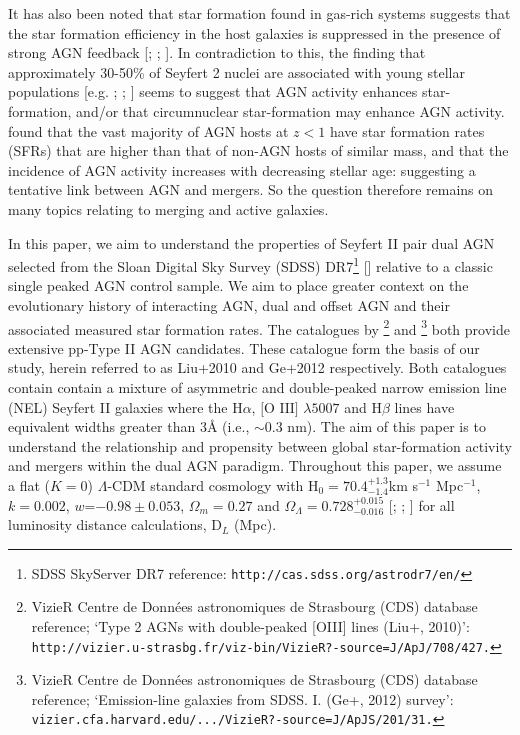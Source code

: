 It has also been noted that star formation found in gas-rich systems suggests that the star formation efficiency in the host galaxies is suppressed in the presence of strong AGN feedback [\cite{1999ApSS.266..207M}; \cite{2004AAS...204.4905B}; \cite{Di_Matteo_2005}]. In contradiction to this, the finding that approximately 30-50\% of Seyfert 2 nuclei are associated with young stellar populations [e.g. \cite{Delgado_2001}; \cite{Storchi_Bergmann_2001}; \cite{Sarzi_2006}] seems to suggest that AGN activity enhances star-formation, and/or that circumnuclear star-formation may enhance AGN activity. \cite{Silverman_2009} found that the vast majority of AGN hosts at $z<1$ have star formation rates (SFRs) that are higher than that of non-AGN hosts of similar mass, and that the incidence of AGN activity increases with decreasing stellar age: suggesting a tentative link between AGN and mergers. So the question therefore remains on many topics relating to merging and active galaxies.

In this paper, we aim to understand the properties of Seyfert II pair dual AGN selected from the Sloan Digital Sky Survey (SDSS) DR7\footnote{\tiny{SDSS SkyServer DR7 reference: \tt{http://cas.sdss.org/astrodr7/en/}}} [\cite{2009ApJS..182..543A}] relative to a classic single peaked AGN control sample. We aim to place greater context on the evolutionary history of interacting AGN, dual and offset AGN and their associated measured star formation rates. The catalogues by \cite{Liu_2009}\footnote{\tiny{VizieR Centre de Donn\'{e}es astronomiques de Strasbourg (CDS) database reference; `Type 2 AGNs with double-peaked [OIII] lines (Liu+, 2010)': \tt{http://vizier.u-strasbg.fr/viz-bin/VizieR?-source=J/ApJ/708/427}.}} and \cite{Ge_Hu_Wang_Bai_Zhang_2012}\footnote{\tiny{VizieR Centre de Donn\'{e}es astronomiques de Strasbourg (CDS) database reference; `Emission-line galaxies from SDSS. I. (Ge+, 2012) survey': \tt{vizier.cfa.harvard.edu/.../VizieR?-source=J/ApJS/201/31}.}} both provide extensive pp-Type II AGN candidates. These catalogue form the basis of our study, herein referred to as Liu+2010 and Ge+2012 respectively. Both catalogues contain contain a mixture of asymmetric and double-peaked narrow emission line (NEL) Seyfert II galaxies where the $\text{H}\alpha$, $\text{[O III]}$ $\lambda{5007}$ and $\text{H}\beta$ lines have equivalent widths greater than 3\AA{ }(i.e., $\sim{0.3}$ nm). The aim of this paper is to understand the relationship and propensity between global star-formation activity and mergers within the dual AGN paradigm. Throughout this paper, we assume a flat ($K=0$) $\Lambda$-CDM standard cosmology with $\text{H}_0={70.4}^{+1.3}_{-1.4}$km s$^{−1}$ Mpc$^{−1}$, $k={0.002}$, $w$=$-0.98\pm{0.053}$, ${\Omega_{m}}={0.27}$ and ${\Omega_{\Lambda}}={{0.728}^{+0.015}_{-0.016}}$ [\cite{Spergel_2003}; \cite{Reid_2010}; \cite{Jarosik_2011}] for all luminosity distance calculations, $\text{D}_L$ (Mpc).